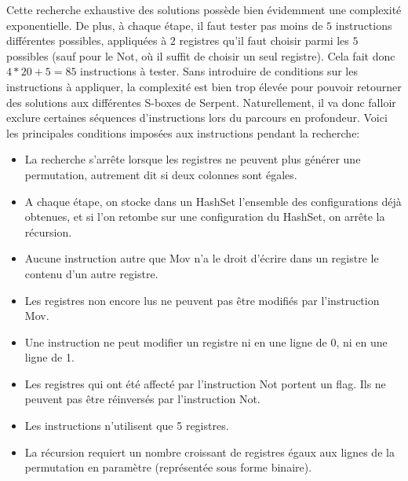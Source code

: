\documentclass{article}
\begin{document}
Cette recherche exhaustive des solutions possède bien évidemment une complexité exponentielle. De plus, à chaque étape, il faut tester pas moins de $5$ instructions différentes possibles, appliquées à $2$ registres qu'il faut choisir parmi les $5$ possibles (sauf pour le Not, où il suffit de choisir un seul registre). Cela fait donc $4*20+5=85$ instructions à tester. Sans introduire de conditions sur les instructions à appliquer, la complexité est bien trop élevée pour pouvoir retourner des solutions aux différentes S-boxes de Serpent.
\medbreak
Naturellement, il va donc falloir exclure certaines séquences d'instructions lors du parcours en profondeur. Voici les principales conditions imposées aux instructions pendant la recherche:
\medbreak
\begin{itemize}
\setlength\itemsep{1em}
\item La recherche s'arrête lorsque les registres ne peuvent plus générer une permutation, autrement dit si deux colonnes sont égales.

\item A chaque étape, on stocke dans un HashSet l'ensemble des configurations déjà obtenues, et si l'on retombe sur une configuration du HashSet, on arrête la récursion.

\item Aucune instruction autre que Mov n'a le droit d'écrire dans un registre le contenu d'un autre registre.

\item Les registres non encore lus ne peuvent pas être modifiés par l'instruction Mov.

\item Une instruction ne peut modifier un registre ni en une ligne de 0, ni en une ligne de 1.
\item Les registres qui ont été affecté par l'instruction Not portent un flag. Ils ne peuvent pas être réinversés par l'instruction Not.

\item Les instructions n'utilisent que 5 registres.

\item La récursion requiert un nombre croissant de registres égaux aux lignes de la permutation en paramètre (représentée sous forme binaire).


\end{itemize}

\medbreak
\end{document}
